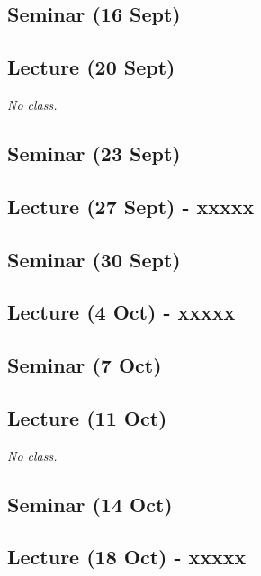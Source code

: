 \documentclass[12pt, a4paper]{article}
\begin{document}
\subsection*{Seminar (16 Sept)}

\subsection*{Lecture (20 Sept) {\color{red}{(No class)}}}

\textit{No class.}

\subsection*{Seminar (23 Sept)}

\subsection*{Lecture (27 Sept) - xxxxx}

\subsection*{Seminar (30 Sept)}

\subsection*{Lecture (4 Oct) - xxxxx}

\subsection*{Seminar (7 Oct)}

\subsection*{Lecture (11 Oct) {\color{red}{(No class)}}}

\textit{No class.}

\subsection*{Seminar (14 Oct)}

\subsection*{Lecture (18 Oct) - xxxxx}
\end{document}
